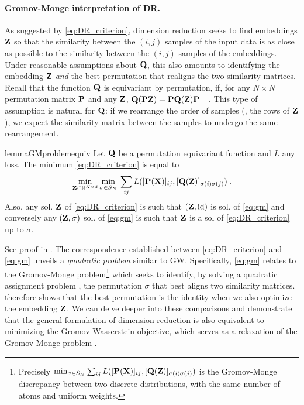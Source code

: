 \paragraph{Gromov-Monge interpretation of DR.} As suggested by
\cref{eq:DR_criterion}, dimension reduction seeks to find embeddings ${\mathbf{Z}}$ so
that the similarity between the $(i,j)$ samples of the input data is as close as
possible to the similarity between the $(i,j)$ samples of the embeddings. Under
reasonable assumptions about ${\mathbf{Q}}$, this also amounts to identifying the embedding ${\mathbf{Z}}$ \emph{and} the best permutation that realigns the two similarity matrices. %
Recall that the function ${\mathbf{Q}}$ is equivariant by permutation, if, for any $N \times N$ permutation matrix ${\mathbf{P}}$ and any
${\mathbf{Z}}$, ${\mathbf{Q}}({\mathbf{P}} {\mathbf{Z}}) = {\mathbf{P}} {\mathbf{Q}}({\mathbf{Z}}) {\mathbf{P}}^\top$ \citep{bronstein2021geometric}.
This type of assumption is natural for ${\mathbf{Q}}$: if we rearrange the order of
samples (\ie, the rows of ${\mathbf{Z}}$), we expect the similarity matrix between the
samples to undergo the same rearrangement. 
\begin{restatable}{lemma}{GMproblemequiv}
\label{lemma:GMproblemequiv}
Let ${\mathbf{Q}}$ be a permutation equivariant function and $L$ any loss. The minimum \cref{eq:DR_criterion} is equal to 
\begin{equation}
\label{eq:gm}
\min_{{\mathbf{Z}} \in \mathbb{R}^{N \times d}} \min_{\sigma \in S_N} \: \sum_{ij} L([{\mathbf{P}}({\mathbf{X}})]_{ij}, [{\mathbf{Q}}({\mathbf{Z}})]_{\sigma(i) \sigma(j)}) \:.
\end{equation}
Also, any sol. ${\mathbf{Z}}$ of \cref{eq:DR_criterion} is such that $({\mathbf{Z}}, \operatorname{id})$ is sol. of \cref{eq:gm} and conversely any $({\mathbf{Z}}, \sigma)$ sol. of \cref{eq:gm} is such that ${\mathbf{Z}}$ is a sol of \cref{eq:DR_criterion} up to $\sigma$.
\end{restatable}
See proof in . The correspondence established between \cref{eq:DR_criterion} and \cref{eq:gm}
unveils a \emph{quadratic problem} similar to GW. Specifically, \cref{eq:gm} relates to
the Gromov-Monge problem\footnote{Precisely $\min_{\sigma \in S_N} \sum_{ij} L([{\mathbf{P}}({\mathbf{X}})]_{ij}, [{\mathbf{Q}}({\mathbf{Z}})]_{\sigma(i) \sigma(j)})$ is the Gromov-Monge discrepancy between two discrete distributions, with the same number of atoms and uniform weights.}
\citep{memoli2018gromov} which seeks to identify, by solving a quadratic assignment problem \citep{cela2013quadratic}, the permutation $\sigma$ that best
aligns two similarity matrices.  therefore shows that the best permutation is the identity when we also optimize the embedding ${\mathbf{Z}}$.
We can delve deeper into these comparisons and demonstrate that the general formulation of dimension reduction is also equivalent to minimizing the Gromov-Wasserstein objective, which serves as a relaxation of the Gromov-Monge problem \citep{memoli2022comparison}.


